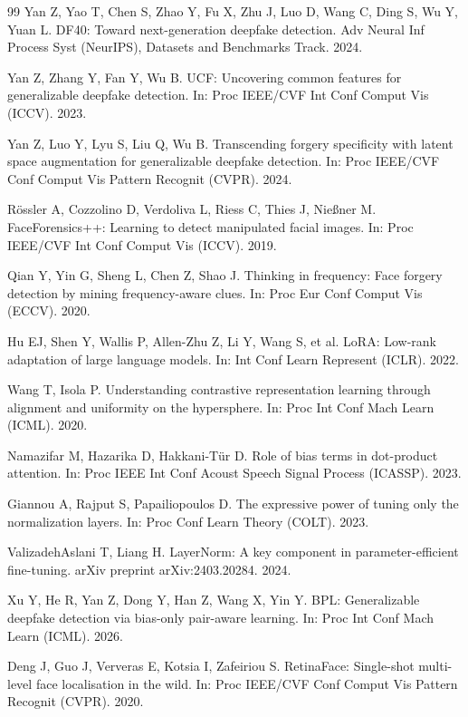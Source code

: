 \documentclass[fonts]{icst}
\begin{document}
\begin{thebibliography}{99}
Yan Z, Yao T, Chen S, Zhao Y, Fu X, Zhu J, Luo D, Wang C, Ding S, Wu Y, Yuan L.
DF40: Toward next-generation deepfake detection.
Adv Neural Inf Process Syst (NeurIPS), Datasets and Benchmarks Track. 2024.

Yan Z, Zhang Y, Fan Y, Wu B.
UCF: Uncovering common features for generalizable deepfake detection.
In: Proc IEEE/CVF Int Conf Comput Vis (ICCV). 2023.

Yan Z, Luo Y, Lyu S, Liu Q, Wu B.
Transcending forgery specificity with latent space augmentation for generalizable deepfake detection.
In: Proc IEEE/CVF Conf Comput Vis Pattern Recognit (CVPR). 2024.

R{\"o}ssler A, Cozzolino D, Verdoliva L, Riess C, Thies J, Nie{\ss}ner M.
FaceForensics++: Learning to detect manipulated facial images.
In: Proc IEEE/CVF Int Conf Comput Vis (ICCV). 2019.

Qian Y, Yin G, Sheng L, Chen Z, Shao J.
Thinking in frequency: Face forgery detection by mining frequency-aware clues.
In: Proc Eur Conf Comput Vis (ECCV). 2020.

Hu EJ, Shen Y, Wallis P, Allen-Zhu Z, Li Y, Wang S, et al.
LoRA: Low-rank adaptation of large language models.
In: Int Conf Learn Represent (ICLR). 2022.

Wang T, Isola P.
Understanding contrastive representation learning through alignment and uniformity on the hypersphere.
In: Proc Int Conf Mach Learn (ICML). 2020.

Namazifar M, Hazarika D, Hakkani-T{\"u}r D.
Role of bias terms in dot-product attention.
In: Proc IEEE Int Conf Acoust Speech Signal Process (ICASSP). 2023.

Giannou A, Rajput S, Papailiopoulos D.
The expressive power of tuning only the normalization layers.
In: Proc Conf Learn Theory (COLT). 2023.

ValizadehAslani T, Liang H.
LayerNorm: A key component in parameter-efficient fine-tuning.
arXiv preprint arXiv:2403.20284. 2024.

Xu Y, He R, Yan Z, Dong Y, Han Z, Wang X, Yin Y.
BPL: Generalizable deepfake detection via bias-only pair-aware learning.
In: Proc Int Conf Mach Learn (ICML). 2026.

Deng J, Guo J, Ververas E, Kotsia I, Zafeiriou S.
RetinaFace: Single-shot multi-level face localisation in the wild.
In: Proc IEEE/CVF Conf Comput Vis Pattern Recognit (CVPR). 2020.


\end{thebibliography}
\end{document}
